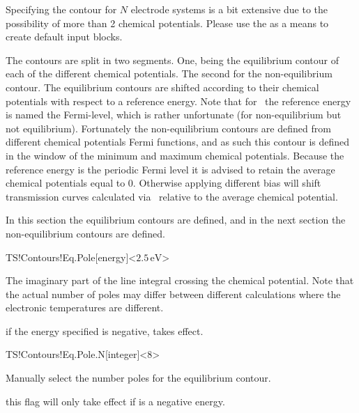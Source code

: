 Specifying the contour for $N$ electrode systems is a bit extensive
due to the possibility of more than 2 chemical potentials. Please use
the  as a means to create default input
blocks.

The contours are split in two segments. One, being the equilibrium
contour of each of the different chemical potentials. The second for
the non-equilibrium contour. The equilibrium contours are shifted
according to their chemical potentials with respect to a reference
energy. Note that for \tsiesta\ the reference energy is named the
Fermi-level, which is rather unfortunate (for non-equilibrium but not
equilibrium). Fortunately the non-equilibrium contours are defined
from different chemical potentials Fermi functions, and as such this
contour is defined in the window of the minimum and maximum chemical
potentials. Because the reference energy is the periodic Fermi level
it is advised to retain the average chemical potentials equal to
$0$. Otherwise applying different bias will shift transmission curves
calculated via \tbtrans\ relative to the average chemical potential.

In this section the equilibrium contours are defined, and in the next
section the non-equilibrium contours are defined.

\begin{fdfentry}{TS!Contours!Eq.Pole}[energy]<$2.5\,\mathrm{eV}$>

  The imaginary part of the line integral crossing the chemical
  potential. Note that the actual number of poles may differ between
  different calculations where the electronic temperatures are
  different.

  \note if the energy specified is negative,
   takes effect.
  
\end{fdfentry}

\begin{fdfentry}{TS!Contours!Eq.Pole.N}[integer]<8>

  Manually select the number poles for the equilibrium contour. 

  \note this flag will only take effect if 
  is a negative energy.
  
\end{fdfentry}

